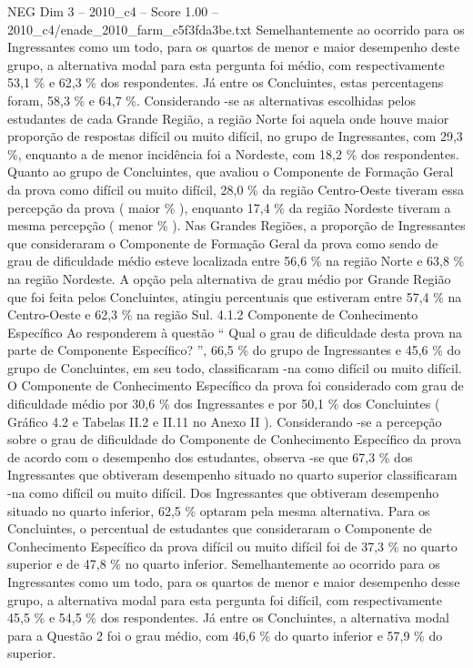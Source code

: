 \begin{textsample}{NEG Dim 3 – 2010\_c4 – Score 1.00 – 2010\_c4/enade\_2010\_farm\_c5f3fda3be.txt}
Semelhantemente ao ocorrido para os Ingressantes como um todo, para os quartos de menor e maior desempenho deste grupo, a alternativa modal para esta pergunta foi médio, com respectivamente 53,1 \% e 62,3 \% dos respondentes.
Já entre os Concluintes, estas percentagens foram, 58,3 \% e 64,7 \%.
Considerando -se as alternativas escolhidas pelos estudantes de cada Grande Região, a região Norte foi aquela onde houve maior proporção de respostas difícil ou muito difícil, no grupo de Ingressantes, com 29,3 \%, enquanto a de menor incidência foi a Nordeste, com 18,2 \% dos respondentes.
Quanto ao grupo de Concluintes, que avaliou o Componente de Formação Geral da prova como difícil ou muito difícil, 28,0 \% da região Centro-Oeste tiveram essa percepção da prova ( maior \% ), enquanto 17,4 \% da região Nordeste tiveram a mesma percepção ( menor \% ).
Nas Grandes Regiões, a proporção de Ingressantes que consideraram o Componente de Formação Geral da prova como sendo de grau de dificuldade médio esteve localizada entre 56,6 \% na região Norte e 63,8 \% na região Nordeste.
A opção pela alternativa de grau médio por Grande Região que foi feita pelos Concluintes, atingiu percentuais que estiveram entre 57,4 \% na Centro-Oeste e 62,3 \% na região Sul. 4.1.2 Componente de Conhecimento Específico Ao responderem à questão “ Qual o grau de dificuldade desta prova na parte de Componente Específico? ”, 66,5 \% do grupo de Ingressantes e 45,6 \% do grupo de Concluintes, em seu todo, classificaram -na como difícil ou muito difícil.
O Componente de Conhecimento Específico da prova foi considerado com grau de dificuldade médio por 30,6 \% dos Ingressantes e por 50,1 \% dos Concluintes ( Gráfico 4.2 e Tabelas II.2 e II.11 no Anexo II ).
Considerando -se a percepção sobre o grau de dificuldade do Componente de Conhecimento Específico da prova de acordo com o desempenho dos estudantes, observa -se que 67,3 \% dos Ingressantes que obtiveram desempenho situado no quarto superior classificaram -na como difícil ou muito difícil.
Dos Ingressantes que obtiveram desempenho situado no quarto inferior, 62,5 \% optaram pela mesma alternativa.
Para os Concluintes, o percentual de estudantes que consideraram o Componente de Conhecimento Específico da prova difícil ou muito difícil foi de 37,3 \% no quarto superior e de 47,8 \% no quarto inferior.
Semelhantemente ao ocorrido para os Ingressantes como um todo, para os quartos de menor e maior desempenho desse grupo, a alternativa modal para esta pergunta foi difícil, com respectivamente 45,5 \% e 54,5 \% dos respondentes.
Já entre os Concluintes, a alternativa modal para a Questão 2 foi o grau médio, com 46,6 \% do quarto inferior e 57,9 \% do superior.

\end{textsample}
